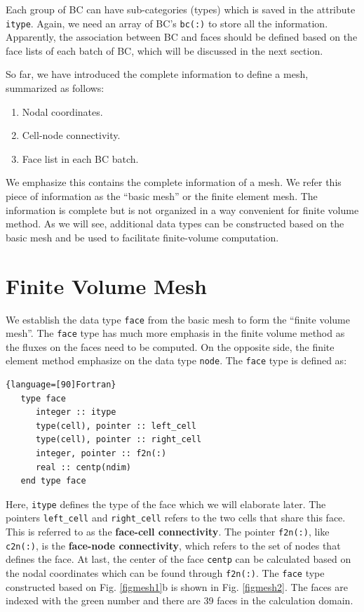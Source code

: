 \documentclass[12pt, letterpaper]{report}
\begin{document}
Each group of BC can have sub-categories (types) which is saved in the attribute \verb+itype+.
Again, we need an array of BC's \verb+bc(:)+ to store all the information. Apparently, the
association between BC and faces should be defined based on the face lists of each batch of BC,
which will be discussed in the next section.
\paraspace

So far, we have introduced the complete information to define a mesh, summarized as follows:

\begin{enumerate}
   \item Nodal coordinates.
   \item Cell-node connectivity.
   \item Face list in each BC batch.
\end{enumerate}

We emphasize this contains the complete information of a mesh. We refer this piece of information as
the ``basic mesh'' or the finite element mesh. The information is complete but is not organized in a
way convenient for finite volume method. As we will see, additional data types can be constructed
based on the basic mesh and be used to facilitate finite-volume computation. 
\paraspace

\clearpage
\section{Finite Volume Mesh} \label{c1s2}

We establish the data type \verb+face+ from the basic mesh to form the ``finite volume mesh''. The
\verb+face+ type has much more emphasis in the finite volume method as the fluxes on the faces need
to be computed. On the opposite side, the finite element method emphasize on the data type
\verb+node+. The \verb+face+ type is defined as:

\begin{lstlisting}{language=[90]Fortran}
   type face
      integer :: itype
      type(cell), pointer :: left_cell
      type(cell), pointer :: right_cell
      integer, pointer :: f2n(:)
      real :: centp(ndim)
   end type face
\end{lstlisting}

Here, \verb+itype+ defines the type of the face which we will elaborate later. The pointers
\verb+left_cell+ and \verb+right_cell+ refers to the two cells that share this face. This is
referred to as the {\bf face-cell connectivity}. The pointer \verb+f2n(:)+, like \verb+c2n(:)+, is
the {\bf face-node connectivity}, which refers to the set of nodes that defines the face. At last,
the center of the face \verb+centp+ can be calculated based on the nodal coordinates which can be
found through \verb+f2n(:)+. The \verb+face+ type constructed based on Fig. \ref{figmesh1}b is
shown in Fig. \ref{figmesh2}. The faces are indexed with the green number and there are 39 faces in
the calculation domain.
\end{document}
